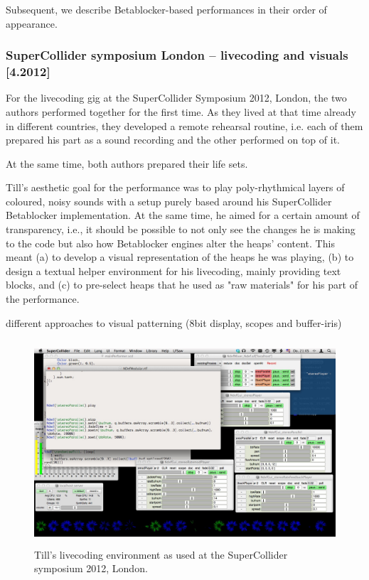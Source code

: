 \documentclass[letterpaper, 12pt]{article}
\begin{document}
Subsequent, we describe Betablocker-based performances in their order of appearance.

\subsubsection{SuperCollider symposium London -- livecoding and visuals [4.2012]}
\label{sub:livecoding_and_visuals}

For the livecoding gig at the SuperCollider Symposium 2012, London, the two authors performed together for the first time. 
As they lived at that time already in different countries, they developed a remote rehearsal routine, i.e. each of them prepared his part as a sound recording and the other performed on top of it.

At the same time, both authors prepared their life sets.

Till's aesthetic goal for the performance was to play poly-rhythmical layers of coloured, noisy sounds with a setup purely based around his SuperCollider Betablocker implementation. 
At the same time, he aimed for a certain amount of transparency, i.e., it should be possible to not only see the changes he is making to the code but also how  Betablocker engines alter the heaps' content.
This meant 
(a) to develop a visual representation of the heaps he was playing, 
(b) to design a textual helper environment for his livecoding, mainly providing text blocks, and
(c) to pre-select heaps that he used as "raw materials" for his part of the  performance.

different approaches to visual patterning (8bit display, scopes and buffer-iris)


\begin{figure}
	\centering
		\includegraphics[height=3in]{2012-SuperColliderSymposiumLiveCodingEnvironment-till}
	\caption{Till's livecoding environment as used at the SuperCollider symposium 2012, London.}
	\label{fig:fig_2012-SuperColliderSymposiumLiveCodingEnvironment-till}
\end{figure}
\end{document}
